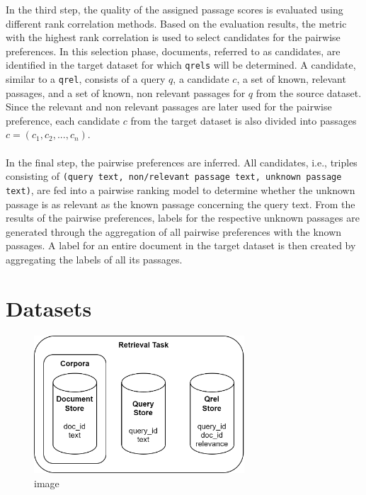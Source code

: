 In the third step, the quality of the assigned passage scores is evaluated using different rank correlation methods. Based on the evaluation results, the metric with the highest rank correlation is used to select candidates for the pairwise preferences. In this selection phase, documents, referred to as candidates, are identified in the target dataset for which \texttt{qrels} will be determined. A candidate, similar to a \texttt{qrel}, consists of a query $q$, a candidate $c$, a set of known, relevant passages, and a set of known, non relevant passages for $q$ from the source dataset. Since the relevant and non relevant passages are later used for the pairwise preference, each candidate $c$ from the target dataset is also divided into passages $c=(c_1, c_2, ..., c_n)$.
\\\\
In the final step, the pairwise preferences are inferred. All candidates, i.e., triples consisting of \texttt{(query text, non/relevant passage text, unknown passage text)}, are fed into a pairwise ranking model to determine whether the unknown passage is as relevant as the known passage concerning the query text. From the results of the pairwise preferences, labels for the respective unknown passages are generated through the aggregation of all pairwise preferences with the known passages. A label for an entire document in the target dataset is then created by aggregating the labels of all its passages.

\pagebreak


\section{Datasets}\label{datasets}

\begin{figure}[ht]
    \centering
    \includegraphics[width=0.7\textwidth]{./graphics/drawio/datasets.png}
    \caption{image}
  \end{figure}


